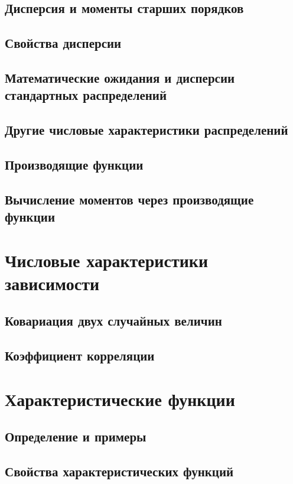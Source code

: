 \subsection{Дисперсия и моменты старших порядков}


\subsection{Свойства дисперсии}


\subsection{Математические ожидания и дисперсии стандартных распределений}


\subsection{Другие числовые характеристики распределений}


\subsection{Производящие функции}


% 

\subsection{Вычисление моментов через производящие функции}




\section{Числовые характеристики зависимости}

\subsection{Ковариация двух случайных величин}


\subsection{Коэффициент корреляции}





\section{Характеристические функции}

\subsection{Определение и примеры}


\subsection{Свойства характеристических функций}


